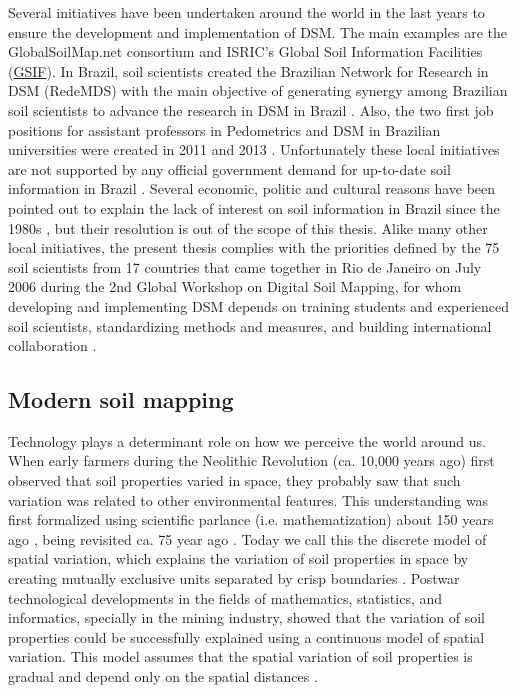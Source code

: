Several initiatives have been undertaken around the world in the last years to 
ensure the development and implementation of DSM. The main examples are the 
GlobalSoilMap.net consortium and ISRIC's Global Soil Information Facilities
(\href{http://www.isric.org/projects/global-soil-information-facilities-gsif}{GSIF}).
In Brazil, soil scientists created the Brazilian Network for Research in DSM 
(RedeMDS) with the main objective of generating synergy among Brazilian soil 
scientists to advance the research in DSM in Brazil \cite{RedeMDS2013}. Also, 
the two first job positions for assistant professors in Pedometrics and DSM in 
Brazilian universities were created in 2011 and 2013 \cite{UFRRJ2011,UFSM2012}. 
Unfortunately these local initiatives are not supported by any official 
government demand for up-to-date soil information in Brazil 
\cite{SamuelRosa2012}. Several economic, politic and cultural reasons have been 
pointed out to explain the lack of interest on soil information in Brazil since 
the 1980s \cite{Dalmolin1999, Ker1999, KerEtAl2003, Ramos2003, Espindola2008}, 
but their resolution is out of the scope of this thesis. Alike many other local
initiatives, the present thesis complies with the priorities defined by the 75 
soil scientists from 17 countries that came together in Rio de Janeiro on July 
2006 during the 2nd Global Workshop on Digital Soil Mapping, for whom developing
and implementing DSM depends on training students and experienced soil 
scientists, standardizing methods and measures, and building international 
collaboration \cite{Boettinger2004}.

\subsection{Modern soil mapping} %

Technology plays a determinant role on how we perceive the world around us. When early farmers during the Neolithic Revolution (ca. 10,000 years ago) first observed that soil properties varied in space, they probably saw that such variation was related to other environmental features. This understanding was first formalized using scientific parlance (i.e. mathematization) about 150 years ago \cite{Florinsky2012}, being revisited ca. 75 year ago \cite{Jenny1941}. Today we call this the discrete model of spatial variation, which explains the variation of soil properties in space by creating mutually exclusive units separated by crisp boundaries \cite{Legros2006}. Postwar technological developments in the fields of mathematics, statistics, and informatics, specially in the mining industry, showed that the variation of soil properties could be successfully explained using a continuous model of spatial variation. This model assumes that the spatial variation of soil properties is gradual and depend only on the spatial distances \cite{WebsterEtAl1990}.

